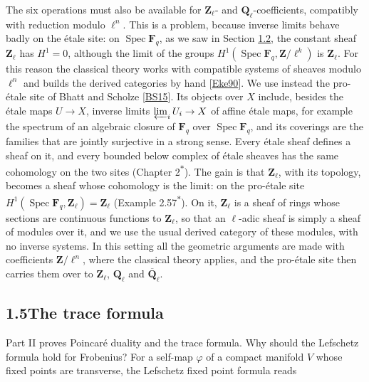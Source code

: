 \documentclass[11pt]{article}
\newcommand{\bpout}[1]{#1\textsuperscript{\hyperlink{bp-outside}{\ensuremath{\ast}}}}
\begin{document}
The six operations must also be available for \(\mathbf Z_\ell\)- and \(\mathbf Q_\ell\)-coefficients, compatibly with reduction modulo \(\ell^n\). This is a problem, because inverse limits behave badly on the étale site: on \(\operatorname{Spec}\mathbf F_q\), as we saw in Section \hyperref[bp5]{1.2}, the constant sheaf \(\mathbf Z_\ell\) has \(H^1=0\), although the limit of the groups \(H^1(\operatorname{Spec}\mathbf F_q,\mathbf Z/\ell^k)\) is \(\mathbf Z_\ell\). For this reason the classical theory works with compatible systems of sheaves modulo \(\ell^n\) and builds the derived categories by hand [\hyperref[bp34]{Eke90}]. We use instead the pro-étale site of Bhatt and Scholze [\hyperref[bp35]{BS15}]. Its objects over \(X\) include, besides the étale maps \(U\to X\), inverse limits \(\varprojlim_iU_i\to X\) of affine étale maps, for example the spectrum of an algebraic closure of \(\mathbf F_q\) over \(\operatorname{Spec}\mathbf F_q\), and its coverings are the families that are jointly surjective in a strong sense. Every étale sheaf defines a sheaf on it, and every bounded below complex of étale sheaves has the same cohomology on the two sites (Chapter \bpout{2}). The gain is that \(\mathbf Z_\ell\), with its topology, becomes a sheaf whose cohomology is the limit: on the pro-étale site \(H^1(\operatorname{Spec}\mathbf F_q,\mathbf Z_\ell)=\mathbf Z_\ell\) (Example \bpout{2.57}). On it, \(\mathbf Z_\ell\) is a sheaf of rings whose sections are continuous functions to \(\mathbf Z_\ell\), so that an \(\ell\)-adic sheaf is simply a sheaf of modules over it, and we use the usual derived category of these modules, with no inverse systems. In this setting all the geometric arguments are made with coefficients \(\mathbf Z/\ell^n\), where the classical theory applies, and the pro-étale site then carries them over to \(\mathbf Z_\ell\), \(\mathbf Q_\ell\) and \(\overline{\mathbf Q}_\ell\).


\subsection*{\texorpdfstring{1.5\quad The trace formula}{1.5 The trace formula}}
\label{bp11}%
\label{bp12}%
Part II proves Poincaré duality and the trace formula. Why should the Lefschetz formula hold for Frobenius? For a self-map \(\varphi\) of a compact manifold \(V\) whose fixed points are transverse, the Lefschetz fixed point formula reads
\end{document}
